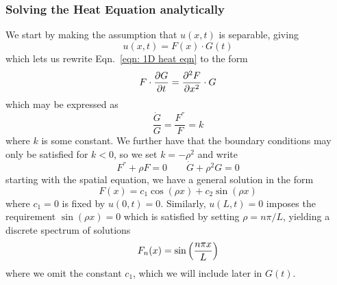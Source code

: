 \documentclass[reprint, english, nofootinbib]{revtex4-2}
\begin{document}
\subsubsection{Solving the Heat Equation analytically}
\noindent 
We start by making the assumption that $u(x, t)$ is separable, giving 
\begin{equation}
    u(x, t) = F(x) \cdot G(t)
\end{equation}
which lets us rewrite Eqn.~\ref{eqn: 1D heat eqn} to the form
\begin{equation}
    F \cdot \pdv{G}{t} = \pdv[2]{F}{x} \cdot G
\end{equation}
which may be expressed as
\begin{equation}
    \frac{\dot G}{G} = \frac{F^{''}}{F} = k
\end{equation}
where $k$ is some constant. We further have that the boundary conditions may only be satisfied for $k <  0$, so we set $k = -\rho^2$ and write
\begin{equation}
    F^{''} + \rho F = 0 \quad \quad \dot G + \rho^2G = 0
\end{equation}
starting with the spatial equation, we have a general solution in the form 
\begin{equation}
    F(x) = c_1 \cos(\rho x) + c_2 \sin(\rho x)
\end{equation}
where $c_1 = 0$ is fixed by $u(0, t) = 0$. Similarly, $u(L, t) = 0$ imposes the requirement $\sin(\rho x) = 0$ which is satisfied by setting $\rho = n\pi/L$, yielding a discrete spectrum of solutions
\begin{equation}
    F_n(x) = \sin\qty(\frac{n\pi x}{L})
\end{equation}
where we omit the constant $c_1$, which we will include later in $G(t)$. 
\end{document}
